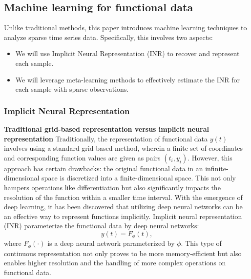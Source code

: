 \documentclass{article}
\begin{document}
\subsection{Machine learning for functional data}
Unlike traditional methods, this paper introduces machine learning techniques to analyze sparse time series data. 
Specifically, this involves two aspects:
\begin{itemize}
  \item We will use Implicit Neural Representation (INR) to recover and represent each sample.
  \item We will leverage meta-learning methods to effectively estimate the INR for each sample with sparse observations.
\end{itemize}

\subsubsection{Implicit Neural Representation}

\textbf{Traditional grid-based representation versus implicit neural representation}
Traditionally, the representation of functional data $y(t)$ involves using a standard grid-based method, 
wherein a finite set of coordinates and corresponding function values are given as pairs $(t_i, y_i)$. 
However, this approach has certain drawbacks: the original functional data in an infinite-dimensional space is discretized into a finite-dimensional space. 
This not only hampers operations like differentiation but also significantly impacts the resolution of the function within a smaller time interval.
With the emergence of deep learning, it has been discovered that utilizing deep neural networks can be an effective way to represent functions implicitly.
Implicit neural representation (INR) parameterize the functional data by deep neural networks:
$$y(t)=F_\phi(t), $$
where $F_\phi(\cdot)$ is a deep neural network parameterized by $\phi$.
This type of continuous representation not only proves to be more memory-efficient but also enables higher resolution and the handling of more complex operations on functional data.
\end{document}
